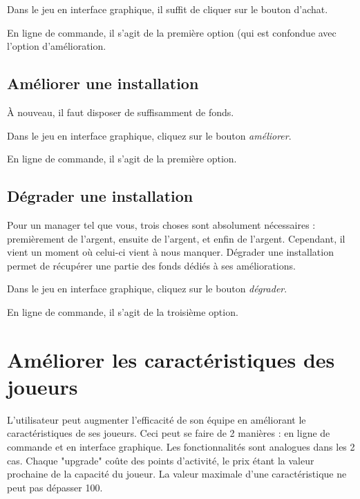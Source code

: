 Dans le jeu en interface graphique, il suffit de cliquer sur le bouton d'achat.

En ligne de commande, il s'agit de la première option (qui est confondue avec l'option d'amélioration.

\subsection{Améliorer une installation}
À nouveau, il faut disposer de suffisamment de fonds.

Dans le jeu en interface graphique, cliquez sur le bouton \emph{améliorer}.

En ligne de commande, il s'agit de la première option.

\subsection{Dégrader une installation}
Pour un manager tel que vous, trois choses sont absolument nécessaires : premièrement de l'argent,
ensuite de l'argent, et enfin de l'argent. Cependant, il vient un moment où celui-ci vient à nous 
manquer. Dégrader une installation permet de récupérer une partie des fonds dédiés à ses améliorations.

Dans le jeu en interface graphique, cliquez sur le bouton \emph{dégrader}.

En ligne de commande, il s'agit de la troisième option.

\section{Améliorer les caractéristiques des joueurs}
L'utilisateur peut augmenter l'efficacité de son équipe en améliorant le caractéristiques de ses joueurs. Ceci peut se faire de 2 manières : en ligne de commande et en interface graphique.
Les fonctionnalités sont analogues dans les 2 cas. Chaque "upgrade" coûte des points d'activité, le prix étant la valeur prochaine de la capacité du joueur. 
La valeur maximale d'une caractéristique ne peut pas dépasser  100.
